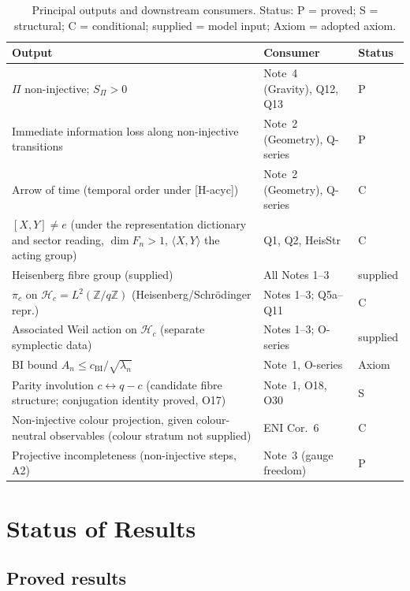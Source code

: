 \documentclass[11pt,a4paper]{article}
\theoremstyle{definition}
\newcommand{\SPI}{S_\Pi}
\newcommand{\cchi}{c_{\mathrm{BI}}}
\newcommand{\Hc}{\mathcal{H}_c}
\newcommand{\pic}{\pi_c}
\begin{document}
    \begin{table}[ht]
      \centering
      \caption{Principal outputs and downstream consumers.
      Status: P = proved; S = structural; C = conditional; supplied = model input;
      Axiom = adopted axiom.}
      \label{tab:outputs}
      \renewcommand{\arraystretch}{1.3}
      \begin{tabular}{@{}p{5.8cm}p{4.2cm}l@{}}
        \toprule
        Output & Consumer & Status \\
        \midrule
        $\Pi$ non-injective; $\SPI > 0$ & Note~4 (Gravity), Q12, Q13 & P \\
        Immediate information loss along non-injective transitions & Note~2 (Geometry), Q-series & P \\
        Arrow of time (temporal order under [H-acyc]) & Note~2 (Geometry), Q-series & C \\
        $[X,Y] \neq e$ (under the representation dictionary and sector reading, $\dim F_n > 1$,
        $\langle X,Y\rangle$
        the acting group) & Q1, Q2, HeisStr & C \\
        Heisenberg fibre group (supplied) & All Notes 1--3 & supplied \\
        $\pic$ on $\Hc=L^2(\mathbb{Z}/q\mathbb{Z})$ (Heisenberg/Schr\"odinger repr.) & Notes 1--3; Q5a--Q11 & C \\
        Associated Weil action on $\Hc$ (separate symplectic data) & Notes 1--3; O-series & supplied \\
        BI bound $A_n \leq \cchi/\sqrt{\lambda_n}$ & Note~1, O-series & Axiom \\
        Parity involution $c \leftrightarrow q-c$ (candidate fibre structure;
        conjugation identity proved, O17) & Note~1, O18, O30 & S \\
        Non-injective colour projection, given colour-neutral observables (colour stratum not supplied)
        & ENI Cor.~6 & C \\
        Projective incompleteness (non-injective steps, A2) & Note~3 (gauge freedom) & P \\
        \bottomrule
      \end{tabular}
    \end{table}

  \section{Status of Results}
    \label{sec:status}

    \subsection{Proved results}
      \label{sec:proved}
\end{document}
